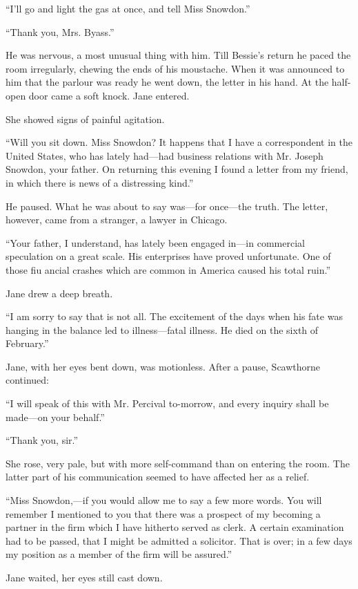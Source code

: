 ``I'll go and light the gas at once, and tell Miss Snowdon.''

``Thank you, Mrs. Byass.''

He was nervous, a most unusual thing with him. Till Bessie's return he
paced the room irregularly, chewing the ends of his moustache. When it
was announced to him that the parlour was ready he went down, the letter
in his hand. At the half-open door came a soft knock. Jane entered.

She showed signs of painful agitation.

``Will you sit down. Miss Snowdon? It happens that I have a
correspondent in the United States, who has lately had---had business
relations with Mr. Joseph Snowdon, your {}father. On returning this
evening I found a letter from my friend, in which there is news of a
distressing kind.''

He paused. What he was about to say was---for once---the truth. The
letter, however, came from a stranger, a lawyer in Chicago.

``Your father, I understand, has lately been engaged in---in commercial
speculation on a great scale. His enterprises have proved unfortunate.
One of those fiu ancial crashes which are common in America caused his
total ruin.''

Jane drew a deep breath.

``I am sorry to say that is not all. The excitement of the days when his
fate was hanging in the balance led to illness---fatal illness. He died
on the sixth of February.''

Jane, with her eyes bent down, was motionless. After a pause, Scawthorne
continued:

``I will speak of this with Mr. Percival to-morrow, and every inquiry
shall be made---on your behalf.''

``Thank you, sir.''

She rose, very pale, but with more self-command than on entering the
room. The latter part of his communication seemed to have affected her
as a relief.

{}``Miss Snowdon,---if you would allow me to say a few more words. You
will remember I mentioned to you that there was a prospect of my
becoming a partner in the firm wbich I have hitherto served as clerk. A
certain examination had to be passed, that I might be admitted a
solicitor. That is over; in a few days my position as a member of the
firm will be assured.''

Jane waited, her eyes still cast down.

